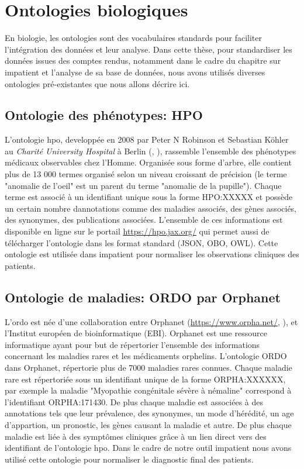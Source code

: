\section{Ontologies biologiques}
En biologie, les ontologies sont des vocabulaires standards pour faciliter l'intégration des données et leur analyse. Dans cette thèse, pour standardiser les données issues des comptes rendus, notamment dans le cadre du chapitre sur \gls{impatient} et l'analyse de sa base de données, nous avons utilisés diverses ontologies pré-existantes que nous allons décrire ici.

\subsection{Ontologie des phénotypes: HPO}
L'ontologie \gls{hpo}, developpée en 2008 par Peter N Robinson et Sebastian Köhler au \textit{Charité University Hospital} à Berlin (\cite{robinson_human_2008}, \cite{kohler_human_2021}), rassemble l'ensemble des phénotypes médicaux observables chez l'Homme. Organisée sous forme d'arbre, elle contient plus de 13 000 termes organisé selon un niveau croissant de précision (le terme "anomalie de l'oeil" est un parent du terme "anomalie de la pupille"). Chaque terme est associé à un identifiant unique sous la forme HPO:XXXXX et possède un certain nombre dannotations comme des maladies associés, des gènes associés, des synonymes, des publications associées. L'ensemble de ces informations est disponible en ligne sur le portail  \href{https://hpo.jax.org/}{https://hpo.jax.org/} qui permet aussi de télécharger l'ontologie dans les format standard (JSON, OBO, OWL). Cette ontologie est utilisée dans \gls{impatient} pour normaliser les observations cliniques des patients.

\subsection{Ontologie de maladies: ORDO par Orphanet}
L'\gls{ordo} est née d'une collaboration entre Orphanet (\href{https://www.orpha.net/}{https://www.orpha.net/}, \cite{maiella_orphanet_2013}), et l'Institut européen de bioinformatique (EBI). Orphanet est une ressource informatique ayant pour but de répertorier l'ensemble des informations concernant les maladies rares et les médicaments orphelins. L'ontologie ORDO dans Orphanet, répertorie plus de 7000 maladies rares connues. Chaque maladie rare est répertoriée sous un identifiant unique de la forme ORPHA:XXXXXX, par exemple la maladie "Myopathie congénitale sévère à némaline" correspond à l'identifiant ORPHA:171430. De plus chaque maladie est associées à des annotations tels que leur prévalence, des synonymes, un mode d'hérédité, un age d'appartion, un pronostic, les gènes causant la maladie et autre. De plus chaque maladie est liée à des symptômes cliniques grâce à un lien direct vers des identifiant de l'ontologie \gls{hpo}. Dans le cadre de notre outil \gls{impatient} nous avons utilisé cette ontologie pour normaliser le diagnostic final des patients.

